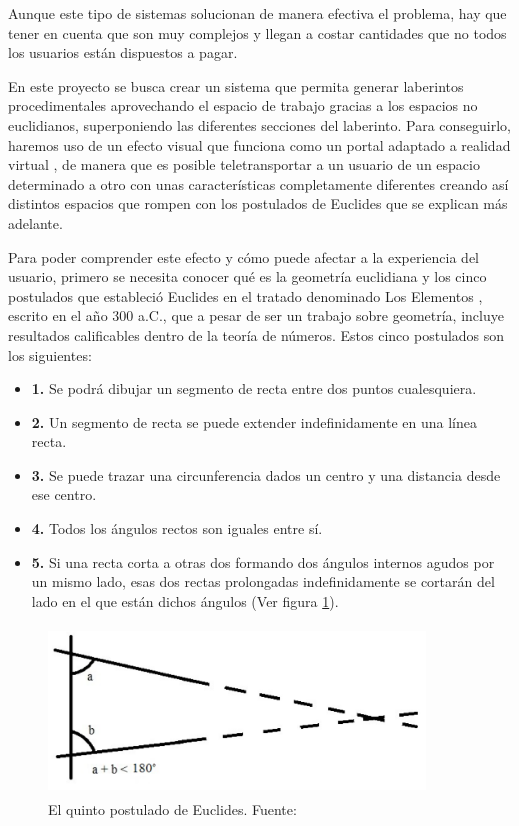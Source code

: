 \documentclass[../main.tex]{subfiles}
\begin{document}
Aunque este tipo de sistemas solucionan de manera efectiva el problema, hay que tener en cuenta que son muy complejos y llegan a costar cantidades que no todos los usuarios están dispuestos a pagar.

En este proyecto se busca crear un sistema que permita generar laberintos procedimentales aprovechando el espacio de trabajo gracias a los espacios no euclidianos, superponiendo las diferentes secciones del laberinto. Para conseguirlo, haremos uso de un efecto visual que funciona como un portal adaptado a realidad virtual \cite{TFG_David}, de manera que es posible teletransportar a un usuario de un espacio determinado a otro con unas características completamente diferentes creando así distintos espacios que rompen con los postulados de Euclides que se explican más adelante.


Para poder comprender este efecto y cómo puede afectar a la experiencia del usuario, primero se necesita conocer qué es la geometría euclidiana y los cinco postulados que estableció Euclides en el tratado denominado Los Elementos \cite{Euclides}, escrito en el año 300 a.C., que a pesar de ser un trabajo sobre geometría, incluye resultados calificables dentro de la teoría de números. Estos cinco postulados son los siguientes:

\begin{itemize}
    \item \textbf{1.} Se podrá dibujar un segmento de recta entre dos puntos cualesquiera.
    \item \textbf{2.} Un segmento de recta se puede extender indefinidamente en una línea recta.
    \item \textbf{3.} Se puede trazar una circunferencia dados un centro y una distancia desde ese centro.
    \item \textbf{4.} Todos los ángulos rectos son iguales entre sí.
    \item \textbf{5.} Si una recta corta a otras dos formando dos ángulos internos agudos por un mismo lado, esas dos rectas prolongadas indefinidamente se cortarán del lado en el que están dichos ángulos (Ver figura \ref{fig:5th_postulate}).
\end{itemize}

\begin{figure}[htbp]
\centering
\includegraphics[width= 10cm, height= 4.5cm]{imagenes/5th_euclid_postulate.png}
\caption{El quinto postulado de Euclides. Fuente:\cite{5th_postulate}}
\label{fig:5th_postulate}
\end{figure}
\end{document}
